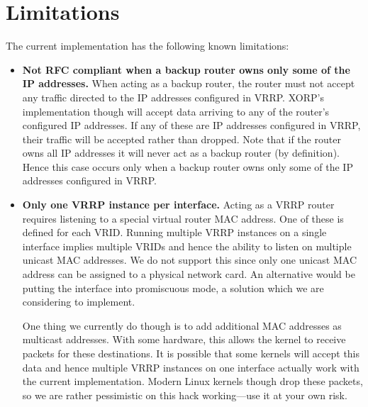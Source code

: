 \section{Limitations}
The current implementation has the following known limitations:
\begin{itemize}
\item {\bf Not RFC compliant when a backup router owns only some of the IP
addresses.}  When acting as a backup router, the router must not accept any
traffic directed to the IP addresses configured in VRRP.  XORP's implementation
though will accept data arriving to any of the router's configured IP addresses.
If any of these are IP addresses configured in VRRP, their traffic will be
accepted rather than dropped.  Note that if the router owns all IP addresses it
will never act as a backup router (by definition).  Hence this case occurs only
when a backup router owns only some of the IP addresses configured in VRRP.

\item {\bf Only one VRRP instance per interface.}  Acting as a VRRP router
requires listening to a special virtual router MAC address.  One of these is
defined for each VRID.  Running multiple VRRP instances on a single interface
implies multiple VRIDs and hence the ability to listen on multiple unicast MAC
addresses.  We do not support this since only one unicast MAC address can be
assigned to a physical network card.  An alternative would be putting the
interface into promiscuous mode, a solution which we are considering to
implement.

One thing we currently do though is to add additional MAC addresses as multicast
addresses.  With some hardware, this allows the kernel to receive packets for
these destinations.  It is possible that some kernels will accept this data and
hence multiple VRRP instances on one interface actually work with the current
implementation.  Modern Linux kernels though drop these packets, so we are
rather pessimistic on this hack working---use it at your own risk.
\end{itemize}
